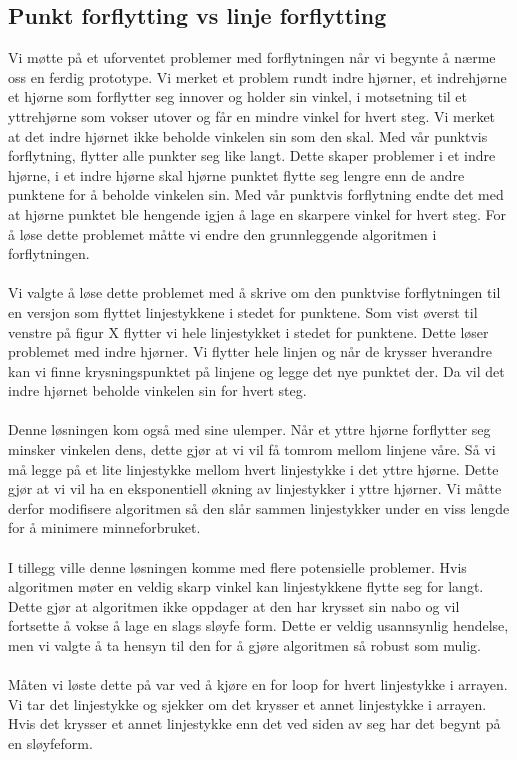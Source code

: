 \subsection{Punkt forflytting vs linje forflytting} 
Vi møtte på et uforventet problemer med forflytningen når vi begynte å nærme oss en ferdig prototype. Vi merket et problem rundt indre hjørner, et indrehjørne et hjørne som forflytter seg innover og holder sin vinkel, i motsetning til et yttrehjørne som vokser utover og får en mindre vinkel for hvert steg. Vi merket at det indre hjørnet ikke beholde vinkelen sin som den skal. Med vår punktvis forflytning, flytter alle punkter seg like langt. Dette skaper problemer i et indre hjørne, i et indre hjørne skal hjørne punktet flytte seg lengre enn de andre punktene for å beholde vinkelen sin. Med vår punktvis forflytning endte det med at hjørne punktet ble hengende igjen å lage en skarpere vinkel for hvert steg. For å løse dette problemet måtte vi endre den grunnleggende algoritmen i forflytningen.\\ \\
Vi valgte å løse dette problemet med å skrive om den punktvise forflytningen til en versjon som flyttet linjestykkene i stedet for punktene. Som vist øverst til venstre på figur X flytter vi hele linjestykket i stedet for punktene. Dette løser problemet med indre hjørner. Vi flytter hele linjen og når de krysser hverandre kan vi finne krysningspunktet på linjene og legge det nye punktet der. Da vil det indre hjørnet beholde vinkelen sin for hvert steg. \\ \\
Denne løsningen kom også med sine ulemper. Når et yttre hjørne forflytter seg minsker vinkelen dens, dette gjør at vi vil få tomrom mellom linjene våre. Så vi må legge på et lite linjestykke mellom hvert linjestykke i det yttre hjørne. Dette gjør at vi vil ha en eksponentiell økning av linjestykker i yttre hjørner. Vi måtte derfor modifisere algoritmen så den slår sammen linjestykker under en viss lengde for å minimere minneforbruket.\\ \\
I tillegg ville denne løsningen komme med flere potensielle problemer. Hvis algoritmen møter en veldig skarp vinkel kan linjestykkene flytte seg for langt. Dette gjør at algoritmen ikke oppdager at den har krysset sin nabo og vil fortsette å vokse å lage en slags sløyfe form. Dette er veldig usannsynlig hendelse, men vi valgte å ta hensyn til den for å gjøre algoritmen så robust som mulig.\\ \\
Måten vi løste dette på var ved å kjøre en for loop for hvert linjestykke i arrayen. Vi tar det linjestykke og sjekker om det krysser et annet linjestykke i arrayen. Hvis det krysser et annet linjestykke enn det ved siden av seg har det begynt på en sløyfeform.  

 





